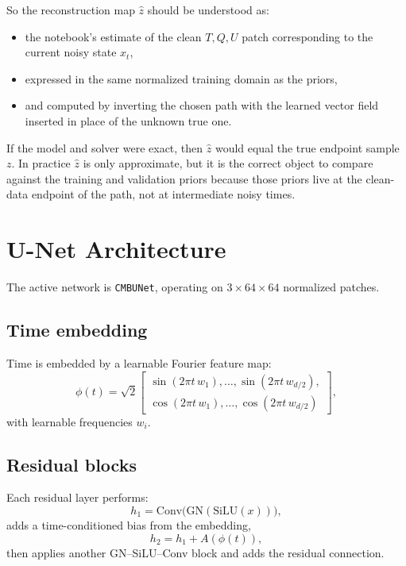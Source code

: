 \documentclass[11pt]{article}
\begin{document}
So the reconstruction map \(\hat z\) should be understood as:
\begin{itemize}[leftmargin=1.5em]
  \item the notebook's estimate of the clean \(T,Q,U\) patch corresponding to the current noisy state \(x_t\),
  \item expressed in the same normalized training domain as the priors,
  \item and computed by inverting the chosen path with the learned vector field inserted in place of the unknown true one.
\end{itemize}

If the model and solver were exact, then \(\hat z\) would equal the true endpoint sample \(z\). In practice \(\hat z\) is only approximate, but it is the correct object to compare against the training and validation priors because those priors live at the clean-data endpoint of the path, not at intermediate noisy times.

\section{U-Net Architecture}

The active network is \texttt{CMBUNet}, operating on \(3\times 64\times 64\) normalized patches.

\subsection{Time embedding}

Time is embedded by a learnable Fourier feature map:
\begin{equation}
  \phi(t)
  =
  \sqrt{2}
  \begin{bmatrix}
    \sin(2\pi t\,w_1), \dots, \sin(2\pi t\,w_{d/2}),\\
    \cos(2\pi t\,w_1), \dots, \cos(2\pi t\,w_{d/2})
  \end{bmatrix},
\end{equation}
with learnable frequencies \(w_i\).

\subsection{Residual blocks}

Each residual layer performs:
\begin{equation}
  h_1 = \mathrm{Conv}\bigl(\mathrm{GN}(\mathrm{SiLU}(x))\bigr),
\end{equation}
adds a time-conditioned bias from the embedding,
\begin{equation}
  h_2 = h_1 + A(\phi(t)),
\end{equation}
then applies another GN--SiLU--Conv block and adds the residual connection.
\end{document}
